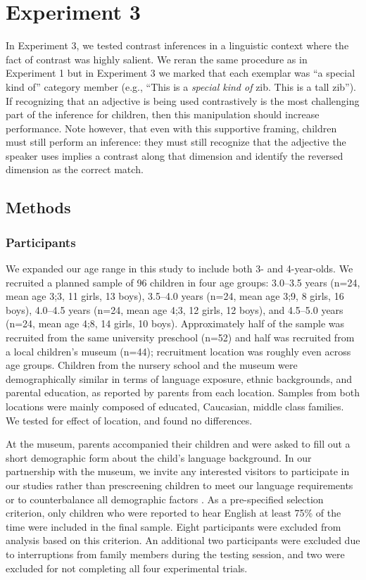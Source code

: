 \documentclass[man]{apa2}
\begin{document}
\section{Experiment 3}

In Experiment 3, we tested contrast inferences in a linguistic context where the fact of contrast was highly salient. We reran the same procedure as in Experiment 1 but in Experiment 3 we marked that each exemplar was ``a special kind of'' category member (e.g., ``This is a \emph{special kind of} zib. This is a tall zib''). If recognizing that an adjective is being used contrastively is the most challenging part of the inference for children, then this manipulation should increase performance. Note however, that even with this supportive framing, children must still perform an inference: they must still recognize that the adjective the speaker uses implies a contrast along that dimension and identify the reversed dimension as the correct match.

\subsection{Methods}

\subsubsection{Participants}

We expanded our age range in this study to include both 3- and 4-year-olds. We recruited a planned sample of 96 children in four age groups: 3.0--3.5 years (n=24, mean age 3;3, 11 girls, 13 boys), 3.5--4.0 years (n=24, mean age 3;9, 8 girls, 16 boys), 4.0--4.5 years (n=24, mean age 4;3, 12 girls, 12 boys), and 4.5--5.0 years (n=24, mean age 4;8, 14 girls, 10 boys).  Approximately half of the sample was recruited from the same university preschool (n=52) and half was recruited from a local children's museum (n=44); recruitment location was roughly even across age groups. Children from the nursery school and the museum were demographically similar in terms of language exposure, ethnic backgrounds, and parental education, as reported by parents from each location. Samples from both locations were mainly composed of educated, Caucasian, middle class families. We tested for effect of location, and found no differences.

At the museum, parents accompanied their children and were asked to fill out a short demographic form about the child's language background. In our partnership with the museum, we invite any interested visitors to participate in our studies rather than prescreening children to meet our language requirements or to counterbalance all demographic factors \cite{callanan2012}. As a pre-specified selection criterion, only children who were reported to hear English at least 75\% of the time were included in the final sample.  Eight participants were excluded from analysis based on this criterion. An additional two participants were excluded due to interruptions from family members during the testing session, and two were excluded for not completing all four experimental trials. 
\end{document}
